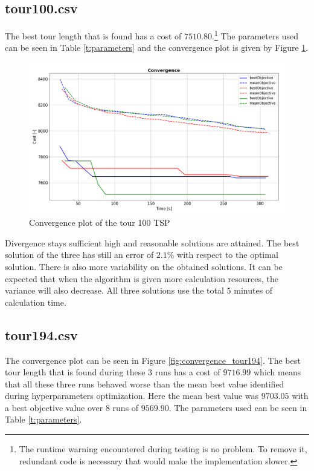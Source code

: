 \documentclass[a4paper,10pt]{article}
\begin{document}




\subsection{tour100.csv}
The best tour length that is found has a cost of $ 7510.80 $.\footnote{The runtime warning encountered during testing is no problem. To remove it, redundant code is necessary that would make the implementation slower. }
The parameters used can be seen in Table \ref{t:parameters} and the convergence plot is given by Figure \ref{fig:convergence_tour100}.

\begin{figure}[h]
	
	\includegraphics[width=1.0\textwidth]{convergence_tour100.PNG}
	\caption{Convergence plot of the tour 100 TSP}
	\label{fig:convergence_tour100}
	\centering
\end{figure}

Divergence stays sufficient high and reasonable solutions are attained. The best solution of the three has still an error of $ 2.1 \% $ with respect to the optimal solution. There is also more variability on the obtained solutions. It can be expected that when the algorithm is given more calculation resources, the variance will also decrease. All three solutions use the total $ 5 $ minutes of calculation time.

\subsection{tour194.csv}
The convergence plot can be seen in Figure \ref{fig:convergence_tour194}.
The best tour length that is found during these $ 3 $ runs has a cost of $9716.99  $ which means that all these three runs behaved worse than the mean best value identified during hyperparameters optimization. Here the mean best value was $ 9703.05 $ with a best objective value over $ 8 $ runs of $ 9569.90 $.
The parameters used can be seen in Table \ref{t:parameters}.
\end{document}
